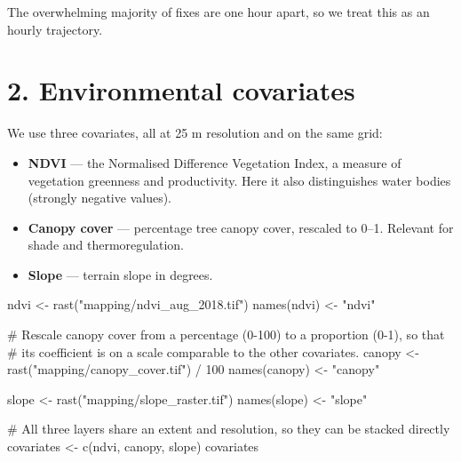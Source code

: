 \documentclass[
  letterpaper,
  DIV=11,
  numbers=noendperiod]{scrartcl}
\newenvironment{Shaded}{\begin{snugshade}}{\end{snugshade}}
\newcommand{\CommentTok}[1]{\textcolor[rgb]{0.37,0.37,0.37}{#1}}
\newcommand{\DecValTok}[1]{\textcolor[rgb]{0.68,0.00,0.00}{#1}}
\newcommand{\FunctionTok}[1]{\textcolor[rgb]{0.28,0.35,0.67}{#1}}
\newcommand{\NormalTok}[1]{\textcolor[rgb]{0.00,0.23,0.31}{#1}}
\newcommand{\OtherTok}[1]{\textcolor[rgb]{0.00,0.23,0.31}{#1}}
\newcommand{\SpecialCharTok}[1]{\textcolor[rgb]{0.37,0.37,0.37}{#1}}
\newcommand{\StringTok}[1]{\textcolor[rgb]{0.13,0.47,0.30}{#1}}
\providecommand{\tightlist}{%
  \setlength{\itemsep}{0pt}\setlength{\parskip}{0pt}}
\begin{document}
The overwhelming majority of fixes are one hour apart, so we treat this
as an hourly trajectory.

\section{2. Environmental covariates}\label{environmental-covariates}

We use three covariates, all at 25 m resolution and on the same grid:

\begin{itemize}
\tightlist
\item
  \textbf{NDVI} --- the Normalised Difference Vegetation Index, a
  measure of vegetation greenness and productivity. Here it also
  distinguishes water bodies (strongly negative values).
\item
  \textbf{Canopy cover} --- percentage tree canopy cover, rescaled to
  0--1. Relevant for shade and thermoregulation.
\item
  \textbf{Slope} --- terrain slope in degrees.
\end{itemize}

\begin{Shaded}
\begin{Highlighting}[]
\NormalTok{ndvi }\OtherTok{\textless{}{-}} \FunctionTok{rast}\NormalTok{(}\StringTok{"mapping/ndvi\_aug\_2018.tif"}\NormalTok{)}
\FunctionTok{names}\NormalTok{(ndvi) }\OtherTok{\textless{}{-}} \StringTok{"ndvi"}

\CommentTok{\# Rescale canopy cover from a percentage (0{-}100) to a proportion (0{-}1), so that}
\CommentTok{\# its coefficient is on a scale comparable to the other covariates.}
\NormalTok{canopy }\OtherTok{\textless{}{-}} \FunctionTok{rast}\NormalTok{(}\StringTok{"mapping/canopy\_cover.tif"}\NormalTok{) }\SpecialCharTok{/} \DecValTok{100}
\FunctionTok{names}\NormalTok{(canopy) }\OtherTok{\textless{}{-}} \StringTok{"canopy"}

\NormalTok{slope }\OtherTok{\textless{}{-}} \FunctionTok{rast}\NormalTok{(}\StringTok{"mapping/slope\_raster.tif"}\NormalTok{)}
\FunctionTok{names}\NormalTok{(slope) }\OtherTok{\textless{}{-}} \StringTok{"slope"}

\CommentTok{\# All three layers share an extent and resolution, so they can be stacked directly}
\NormalTok{covariates }\OtherTok{\textless{}{-}} \FunctionTok{c}\NormalTok{(ndvi, canopy, slope)}
\NormalTok{covariates}
\end{Highlighting}
\end{Shaded}
\end{document}
